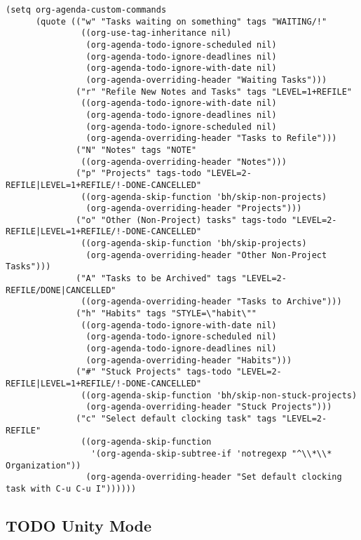 \documentclass[colorlinks=true,urlcolor=blue,listings-sv]{article}
\begin{document}
\lstset{language=Lisp}
\begin{lstlisting}
(setq org-agenda-custom-commands
      (quote (("w" "Tasks waiting on something" tags "WAITING/!"
               ((org-use-tag-inheritance nil)
                (org-agenda-todo-ignore-scheduled nil)
                (org-agenda-todo-ignore-deadlines nil)
                (org-agenda-todo-ignore-with-date nil)
                (org-agenda-overriding-header "Waiting Tasks")))
              ("r" "Refile New Notes and Tasks" tags "LEVEL=1+REFILE"
               ((org-agenda-todo-ignore-with-date nil)
                (org-agenda-todo-ignore-deadlines nil)
                (org-agenda-todo-ignore-scheduled nil)
                (org-agenda-overriding-header "Tasks to Refile")))
              ("N" "Notes" tags "NOTE"
               ((org-agenda-overriding-header "Notes")))
              ("p" "Projects" tags-todo "LEVEL=2-REFILE|LEVEL=1+REFILE/!-DONE-CANCELLED"
               ((org-agenda-skip-function 'bh/skip-non-projects)
                (org-agenda-overriding-header "Projects")))
              ("o" "Other (Non-Project) tasks" tags-todo "LEVEL=2-REFILE|LEVEL=1+REFILE/!-DONE-CANCELLED"
               ((org-agenda-skip-function 'bh/skip-projects)
                (org-agenda-overriding-header "Other Non-Project Tasks")))
              ("A" "Tasks to be Archived" tags "LEVEL=2-REFILE/DONE|CANCELLED"
               ((org-agenda-overriding-header "Tasks to Archive")))
              ("h" "Habits" tags "STYLE=\"habit\""
               ((org-agenda-todo-ignore-with-date nil)
                (org-agenda-todo-ignore-scheduled nil)
                (org-agenda-todo-ignore-deadlines nil)
                (org-agenda-overriding-header "Habits")))
              ("#" "Stuck Projects" tags-todo "LEVEL=2-REFILE|LEVEL=1+REFILE/!-DONE-CANCELLED"
               ((org-agenda-skip-function 'bh/skip-non-stuck-projects)
                (org-agenda-overriding-header "Stuck Projects")))
              ("c" "Select default clocking task" tags "LEVEL=2-REFILE"
               ((org-agenda-skip-function
                 '(org-agenda-skip-subtree-if 'notregexp "^\\*\\* Organization"))
                (org-agenda-overriding-header "Set default clocking task with C-u C-u I"))))))
\end{lstlisting}
\subsection{\textbf{TODO} Unity Mode}
\label{sec-2-22}
\end{document}
